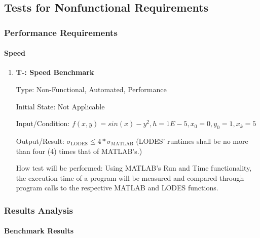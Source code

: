 \documentclass[12pt, titlepage]{article}
\newcounter{tnum} %
\newcommand{\famname}{LODES} %
\begin{document}
%

\subsection{Tests for Nonfunctional Requirements}

\subsubsection{Performance Requirements}
		
\paragraph{Speed}

\begin{enumerate}

\item{\textbf{T-\thetnum \label{t-speed}: Speed Benchmark}}

Type: Non-Functional, Automated, Performance 
					
Initial State: Not Applicable
					
Input/Condition: $f(x, y) = sin(x) - y^2, h = 1E-5, x_0 = 0, y_0 = 1, x_k = 5$
					
Output/Result: $\sigma_\text{\famname{}} \leq 4*\sigma_\text{MATLAB}$ (\famname{}' runtimes shall be no more than four (4) times that of MATLAB's.)
					
How test will be performed: Using MATLAB's Run and Time functionality, the execution time of a program will be measured and compared through program calls to the respective MATLAB and \famname{} functions.\

\end{enumerate}

\subsubsection{Results Analysis}

\paragraph{Benchmark Results}
\end{document}
